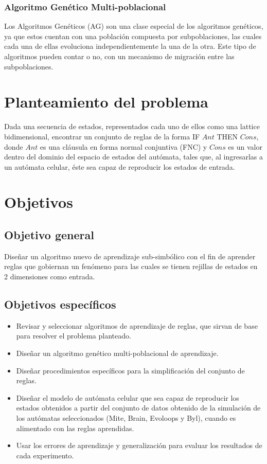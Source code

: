 \subsubsection{Algoritmo Genético Multi-poblacional}

Los Algoritmos Genéticos (AG) son una clase especial de los algoritmos genéticos, ya que estos cuentan con una población compuesta por subpoblaciones, las cuales cada una de ellas evoluciona independientemente la una de la otra. Este tipo de algoritmos pueden contar o no, con un mecanismo de migración entre las subpoblaciones.


\section{Planteamiento del problema}

Dada una secuencia de estados, representados cada uno de ellos como una lattice bidimensional, encontrar un conjunto de reglas de la forma IF $Ant$ THEN $Cons$, donde $Ant$ es una cláusula en forma normal conjuntiva (FNC) y $Cons$ es un valor dentro del dominio del espacio de estados del autómata, tales que, al ingresarlas a un autómata celular, éste sea capaz de reproducir los estados de entrada.

\section{Objetivos}
%
\subsection{Objetivo general}
Diseñar un algoritmo nuevo de aprendizaje sub-simbólico con el fin de aprender reglas que gobiernan un fenómeno para las cuales se tienen rejillas de estados en 2 dimensiones como entrada.

\subsection{Objetivos específicos}
\begin{itemize}
\item Revisar y seleccionar algoritmos de aprendizaje de reglas, que sirvan de base para resolver el problema planteado.
\item Diseñar un algoritmo genético multi-poblacional de aprendizaje.
\item Diseñar procedimientos específicos para la simplificación del conjunto de reglas.
\item Diseñar el modelo de autómata celular que sea capaz de reproducir los estados obtenidos a partir del conjunto de datos obtenido de la simulación de los autómatas seleccionados (Mite, Brain, Evoloops y Byl), cuando es alimentado con las reglas aprendidas.
\item Usar los errores de aprendizaje y generalización para evaluar los resultados de cada experimento. 
\end{itemize}

